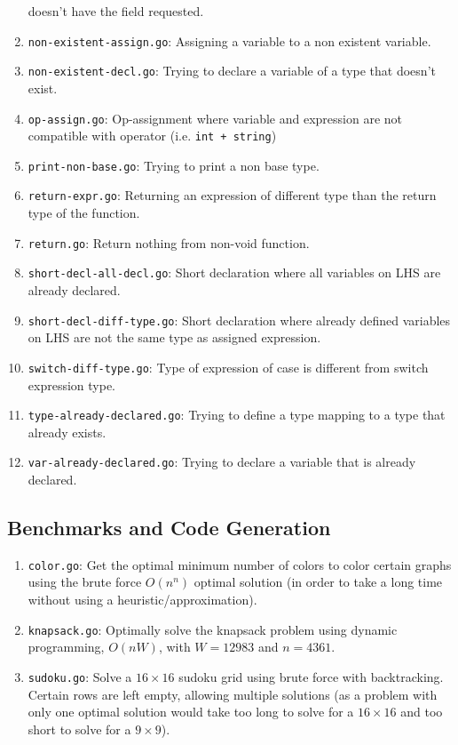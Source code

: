 \documentclass[11pt]{article}
\begin{document}
\begin{enumerate}
  doesn't have the field requested.
\item \texttt{non-existent-assign.go}: Assigning a variable to a non
  existent variable.
\item \texttt{non-existent-decl.go}: Trying to declare a variable of a
  type that doesn't exist.
\item \texttt{op-assign.go}: Op-assignment where variable and
  expression are not compatible with operator (i.e. \texttt{int +
    string})
\item \texttt{print-non-base.go}: Trying to print a non base type.
\item \texttt{return-expr.go}: Returning an expression of different
  type than the return type of the function.
\item \texttt{return.go}: Return nothing from non-void function.
\item \texttt{short-decl-all-decl.go}: Short declaration where all
  variables on LHS are already declared.
\item \texttt{short-decl-diff-type.go}: Short declaration where
  already defined variables on LHS are not the same type as assigned
  expression.
\item \texttt{switch-diff-type.go}: Type of expression of case is
  different from switch expression type.
\item \texttt{type-already-declared.go}: Trying to define a type
  mapping to a type that already exists.
\item \texttt{var-already-declared.go}: Trying to declare a variable
  that is already declared.
\end{enumerate}

\subsection{Benchmarks and Code Generation}

\begin{enumerate}
\item \texttt{color.go}: Get the optimal minimum number of colors to
  color certain graphs using the brute force $O(n^n)$ optimal solution
  (in order to take a long time without using a
  heuristic/approximation).
\item \texttt{knapsack.go}: Optimally solve the knapsack problem using
  dynamic programming, $O(nW)$, with $W = 12983$ and $n = 4361$.
\item \texttt{sudoku.go}: Solve a $16 \times 16$ sudoku grid using
  brute force with backtracking. Certain rows are left empty, allowing
  multiple solutions (as a problem with only one optimal solution
  would take too long to solve for a $16 \times 16$ and too short to
  solve for a $9 \times 9$).
\end{enumerate}
\end{document}
